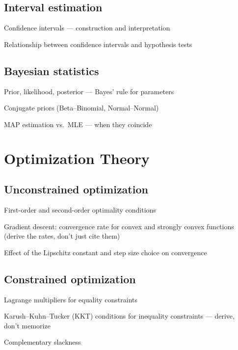 \subsection{Interval estimation}
\begin{tasklist}
    \item Confidence intervals — construction and interpretation
    \item Relationship between confidence intervals and hypothesis tests
\end{tasklist}

\subsection{Bayesian statistics}
\begin{tasklist}
    \item Prior, likelihood, posterior — Bayes' rule for parameters
    \item Conjugate priors (Beta--Binomial, Normal--Normal)
    \item MAP estimation vs.\ MLE — when they coincide
\end{tasklist}

\section{Optimization Theory}

\subsection{Unconstrained optimization}
\begin{tasklist}
    \item First-order and second-order optimality conditions
    \item Gradient descent: convergence rate for convex and strongly convex functions (derive the rates, don't just cite them)
    \item Effect of the Lipschitz constant and step size choice on convergence
\end{tasklist}

\subsection{Constrained optimization}
\begin{tasklist}
    \item Lagrange multipliers for equality constraints
    \item Karush--Kuhn--Tucker (KKT) conditions for inequality constraints — derive, don't memorize
    \item Complementary slackness
\end{tasklist}

